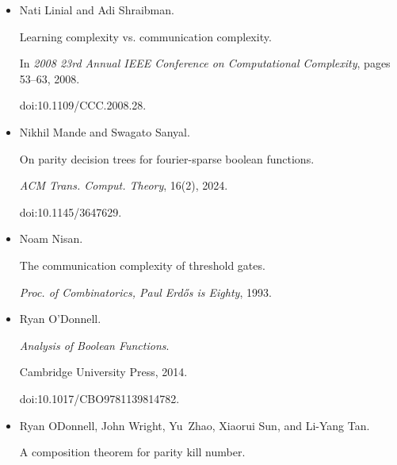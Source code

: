 \documentclass[10pt,a4paper]{article}
\begin{document}
\begin{itemize}
Troy Lee, Adi Shraibman, and Robert Špalek.


A direct product theorem for discrepancy.


In \emph{2008 23rd Annual IEEE Conference on Computational
Complexity}, pages 71–80, 2008.


doi:10.1109/CCC.2008.25.





\item[] 
[42]

Nati Linial and Adi Shraibman.


Learning complexity vs. communication complexity.


In \emph{2008 23rd Annual IEEE Conference on Computational
Complexity}, pages 53–63, 2008.


doi:10.1109/CCC.2008.28.





\item[] 
[43]

Nikhil Mande and Swagato Sanyal.


On parity decision trees for fourier-sparse boolean functions.


\emph{ACM Trans. Comput. Theory}, 16(2), 2024.


doi:10.1145/3647629.





\item[] 
[44]

Noam Nisan.


The communication complexity of threshold gates.


\emph{Proc. of Combinatorics, Paul Erdős is Eighty}, 1993.





\item[] 
[45]

Ryan O’Donnell.


\emph{Analysis of Boolean Functions}.


Cambridge University Press, 2014.


doi:10.1017/CBO9781139814782.





\item[] 
[46]

Ryan ODonnell, John Wright, Yu Zhao, Xiaorui Sun, and Li-Yang Tan.


A composition theorem for parity kill number.



\end{itemize}
\end{document}
